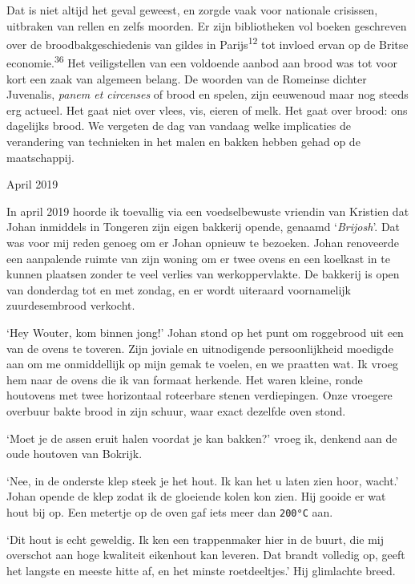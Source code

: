 \documentclass[
  11pt,
  dutch,
]{memoir}
\begin{document}
Dat is niet altijd het geval geweest, en zorgde vaak voor nationale
crisissen, uitbraken van rellen en zelfs moorden. Er zijn bibliotheken
vol boeken geschreven over de broodbakgeschiedenis van gildes in
Parijs\textsuperscript{12} tot invloed ervan op de Britse
economie.\textsuperscript{36} Het veiligstellen van een voldoende aanbod
aan brood was tot voor kort een zaak van algemeen belang. De woorden van
de Romeinse dichter Juvenalis, \emph{panem et circenses} of brood en
spelen, zijn eeuwenoud maar nog steeds erg actueel. Het gaat niet over
vlees, vis, eieren of melk. Het gaat over brood: ons dagelijks brood. We
vergeten de dag van vandaag welke implicaties de verandering van
technieken in het malen en bakken hebben gehad op de maatschappij.

\begin{flushright}
April 2019
\end{flushright}

In april 2019 hoorde ik toevallig via een voedselbewuste vriendin van
Kristien dat Johan inmiddels in Tongeren zijn eigen bakkerij opende,
genaamd `\emph{Brijosh}'. Dat was voor mij reden genoeg om er Johan
opnieuw te bezoeken. Johan renoveerde een aanpalende ruimte van zijn
woning om er twee ovens en een koelkast in te kunnen plaatsen zonder te
veel verlies van werkoppervlakte. De bakkerij is open van donderdag tot
en met zondag, en er wordt uiteraard voornamelijk zuurdesembrood
verkocht.

`Hey Wouter, kom binnen jong!' Johan stond op het punt om roggebrood uit
een van de ovens te toveren. Zijn joviale en uitnodigende
persoonlijkheid moedigde aan om me onmiddellijk op mijn gemak te voelen,
en we praatten wat. Ik vroeg hem naar de ovens die ik van formaat
herkende. Het waren kleine, ronde houtovens met twee horizontaal
roteerbare stenen verdiepingen. Onze vroegere overbuur bakte brood in
zijn schuur, waar exact dezelfde oven stond.

`Moet je de assen eruit halen voordat je kan bakken?' vroeg ik, denkend
aan de oude houtoven van Bokrijk.

`Nee, in de onderste klep steek je het hout. Ik kan het u laten zien
hoor, wacht.' Johan opende de klep zodat ik de gloeiende kolen kon zien.
Hij gooide er wat hout bij op. Een metertje op de oven gaf iets meer dan
\texttt{200°C} aan.

`Dit hout is echt geweldig. Ik ken een trappenmaker hier in de buurt,
die mij overschot aan hoge kwaliteit eikenhout kan leveren. Dat brandt
volledig op, geeft het langste en meeste hitte af, en het minste
roetdeeltjes.' Hij glimlachte breed.
\end{document}
